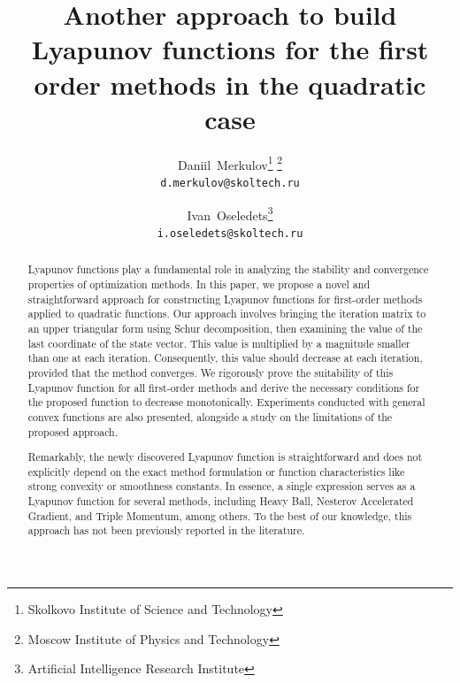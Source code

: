 \documentclass[a4paper,11pt]{article}
\title{Another approach to build Lyapunov functions for the first order methods in the quadratic case}
\author{%
  Daniil~Merkulov\thanks{
  Skolkovo Institute of Science and Technology} \thanks{Moscow Institute of Physics and Technology}\\
  \texttt{d.merkulov@skoltech.ru}
  \and
  Ivan~Oseledets\thanks{
  Artificial Intelligence Research Institute} \footnotemark[1]\\
  \texttt{i.oseledets@skoltech.ru}
}
\date{}
\begin{document}
\maketitle

\begin{abstract}
    Lyapunov functions play a fundamental role in analyzing the stability and convergence properties of optimization methods. In this paper, we propose a novel and straightforward approach for constructing Lyapunov functions for first-order methods applied to quadratic functions. Our approach involves bringing the iteration matrix to an upper triangular form using Schur decomposition, then examining the value of the last coordinate of the state vector. This value is multiplied by a magnitude smaller than one at each iteration. Consequently, this value should decrease at each iteration, provided that the method converges. We rigorously prove the suitability of this Lyapunov function for all first-order methods and derive the necessary conditions for the proposed function to decrease monotonically. Experiments conducted with general convex functions are also presented, alongside a study on the limitations of the proposed approach.

    Remarkably, the newly discovered Lyapunov function is straightforward and does not explicitly depend on the exact method formulation or function characteristics like strong convexity or smoothness constants. In essence, a single expression serves as a Lyapunov function for several methods, including Heavy Ball, Nesterov Accelerated Gradient, and Triple Momentum, among others. To the best of our knowledge, this approach has not been previously reported in the literature.
\end{abstract}
\end{document}
